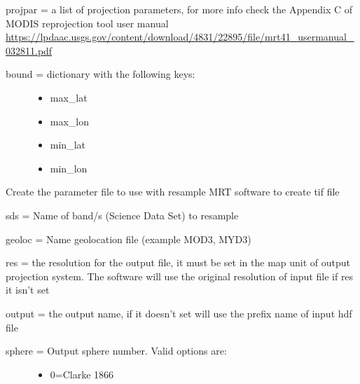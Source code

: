 \documentclass[a4paper,11pt,oneside]{sphinxmanual}
\begin{document}
\begin{fulllineitems}
\begin{fulllineitems}
\begin{description}
\begin{itemize}
\end{itemize}

\end{description}

projpar = a list of projection parameters, for more info check the
Appendix C of MODIS reprojection tool user manual
\href{https://lpdaac.usgs.gov/content/download/4831/22895/file/mrt41\_usermanual\_032811.pdf}{https://lpdaac.usgs.gov/content/download/4831/22895/file/mrt41\_usermanual\_032811.pdf}
\begin{description}
\item[{bound = dictionary with the following keys:}] \leavevmode\begin{itemize}
\item {} 
max\_lat

\item {} 
max\_lon

\item {} 
min\_lat

\item {} 
min\_lon

\end{itemize}

\end{description}

\end{fulllineitems}


\begin{fulllineitems}
\label{pymodis/pymodis:pymodis.parsemodis.parseModis.confResample_swath}
Create the parameter file to use with resample MRT software to create
tif file

sds = Name of band/s (Science Data Set) to resample

geoloc = Name geolocation file (example MOD3, MYD3)

res = the resolution for the output file, it must be set in the map
unit of output projection system. The software will use the
original resolution of input file if res it isn't set

output = the output name, if it doesn't set will use the prefix name
of input hdf file
\begin{description}
\item[{sphere = Output sphere number. Valid options are:}] \leavevmode\begin{itemize}
\item {} 
0=Clarke 1866


\end{itemize}
\end{description}
\end{fulllineitems}
\end{fulllineitems}
\end{document}

